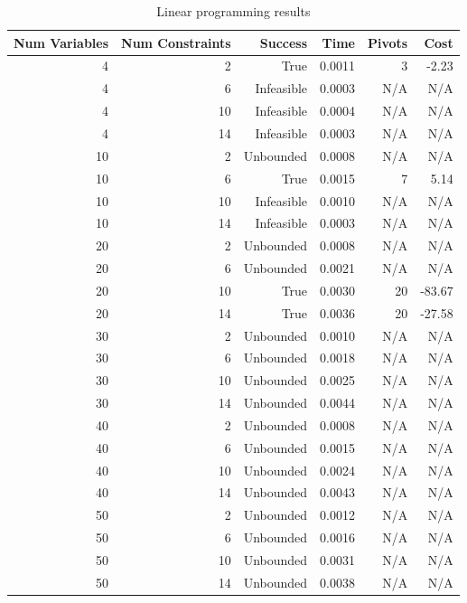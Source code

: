 \begin{table}[ht]
    \centering
    \begin{tabular}{rrrrrr}
        \toprule
        Num Variables & Num Constraints & Success & Time & Pivots & Cost \\
        \midrule
        4 & 2 & True & 0.0011 & 3 & -2.23 \\
		4 & 6 & Infeasible & 0.0003 & N/A & N/A \\
		4 & 10 & Infeasible & 0.0004 & N/A & N/A \\
		4 & 14 & Infeasible & 0.0003 & N/A & N/A \\
		10 & 2 & Unbounded & 0.0008 & N/A & N/A \\
		10 & 6 & True & 0.0015 & 7 & 5.14 \\
		10 & 10 & Infeasible & 0.0010 & N/A & N/A \\
		10 & 14 & Infeasible & 0.0003 & N/A & N/A \\
		20 & 2 & Unbounded & 0.0008 & N/A & N/A \\
		20 & 6 & Unbounded & 0.0021 & N/A & N/A \\
		20 & 10 & True & 0.0030 & 20 & -83.67 \\
		20 & 14 & True & 0.0036 & 20 & -27.58 \\
		30 & 2 & Unbounded & 0.0010 & N/A & N/A \\
		30 & 6 & Unbounded & 0.0018 & N/A & N/A \\
		30 & 10 & Unbounded & 0.0025 & N/A & N/A \\
		30 & 14 & Unbounded & 0.0044 & N/A & N/A \\
		40 & 2 & Unbounded & 0.0008 & N/A & N/A \\
		40 & 6 & Unbounded & 0.0015 & N/A & N/A \\
		40 & 10 & Unbounded & 0.0024 & N/A & N/A \\
		40 & 14 & Unbounded & 0.0043 & N/A & N/A \\
		50 & 2 & Unbounded & 0.0012 & N/A & N/A \\
		50 & 6 & Unbounded & 0.0016 & N/A & N/A \\
		50 & 10 & Unbounded & 0.0031 & N/A & N/A \\
		50 & 14 & Unbounded & 0.0038 & N/A & N/A \\
        \bottomrule
    \end{tabular}
    \caption{Linear programming results}
    \label{tab:lp-results}
\end{table}